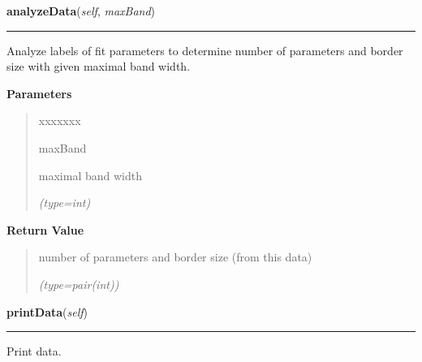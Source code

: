     \label{gblfit:GblData:analyzeData}

    \vspace{0.5ex}

\hspace{.8\funcindent}\begin{boxedminipage}{\funcwidth}

    \raggedright \textbf{analyzeData}(\textit{self}, \textit{maxBand})

    \vspace{-1.5ex}

    \rule{\textwidth}{0.5\fboxrule}
\setlength{\parskip}{2ex}
    Analyze labels of fit parameters to determine number of parameters and 
    border size with given maximal band width.

\setlength{\parskip}{1ex}
      \textbf{Parameters}
      \vspace{-1ex}

      \begin{quote}
        \begin{Ventry}{xxxxxxx}

          \item[maxBand]

          maximal band width

            {\it (type=int)}

        \end{Ventry}

      \end{quote}

      \textbf{Return Value}
    \vspace{-1ex}

      \begin{quote}
      number of parameters and border size (from this data)

      {\it (type=pair(int))}

      \end{quote}

    \end{boxedminipage}

    \label{gblfit:GblData:printData}

    \vspace{0.5ex}

\hspace{.8\funcindent}\begin{boxedminipage}{\funcwidth}

    \raggedright \textbf{printData}(\textit{self})

    \vspace{-1.5ex}

    \rule{\textwidth}{0.5\fboxrule}
\setlength{\parskip}{2ex}
    Print data.

\setlength{\parskip}{1ex}
    \end{boxedminipage}



